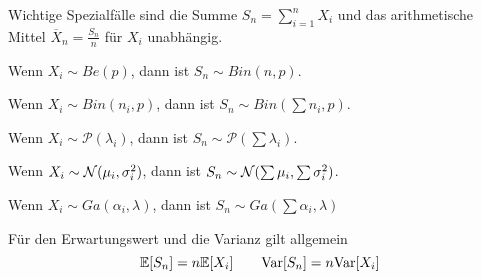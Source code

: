 Wichtige Spezialfälle sind die Summe \(S_n = \sum_{i=1}^n X_i\) und das arithmetische Mittel
\(\overline{X}_n = \frac{S_n}{n}\) für \(X_i\) unabhängig.
\begin{compactenum}
	\item Wenn \(X_i \sim Be(p)\), dann ist \(S_n \sim Bin(n,p)\).
	\item Wenn \(X_i \sim Bin(n_i,p)\), dann ist \(S_n \sim Bin(\sum n_i,p)\).
	\item Wenn \(X_i \sim \mathcal{P}(\lambda_i)\), dann ist \(S_n \sim \mathcal{P}(\sum \lambda_i)\).
	\item Wenn \(X_i \sim \mathcal{N}(\mu_i,\sigma_i^2)\), dann ist \(S_n \sim \mathcal{N}(\sum \mu_i, \sum \sigma_i^2 )\).
	\item Wenn \(X_i \sim Ga(\alpha_i,\lambda)\), dann ist \(S_n \sim Ga(\sum \alpha_i, \lambda)\)
\end{compactenum}

Für den Erwartungswert und die Varianz gilt allgemein
\[
	\mathbb{E}[S_n] = n\mathbb{E}[X_i]
	\qquad
	\mathrm{Var}[S_n] = n\mathrm{Var}[X_i]
\]


